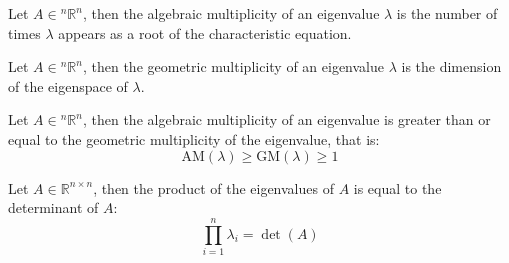 \documentclass[11pt]{article}
\begin{document}
\begin{definition}
    Let $A \in {^n\mathbb{R}^n}$, then the algebraic multiplicity of an eigenvalue $\lambda$ is the number of times $\lambda$ appears as a root of the characteristic equation.
\end{definition}
\begin{definition}
    Let $A \in {^n\mathbb{R}^n}$, then the geometric multiplicity of an eigenvalue $\lambda$ is the dimension of the eigenspace of $\lambda$.
\end{definition}
\begin{theorem}
    Let $A \in {^n\mathbb{R}^n}$, then the algebraic multiplicity of an eigenvalue is greater than or equal to the geometric multiplicity of the eigenvalue, that is:
    \begin{equation}
        \text{AM}(\lambda) \ge \text{GM}(\lambda) \ge 1
    \end{equation}
\end{theorem}
\begin{theorem}
    Let $A \in \mathbb{R}^{n \times n}$, then the product of the eigenvalues of $A$ is equal to the determinant of $A$:
    \begin{equation}
        \prod_{i=1}^{n} \lambda_i = \det(A)
    \end{equation}
\end{theorem}
\end{document}
